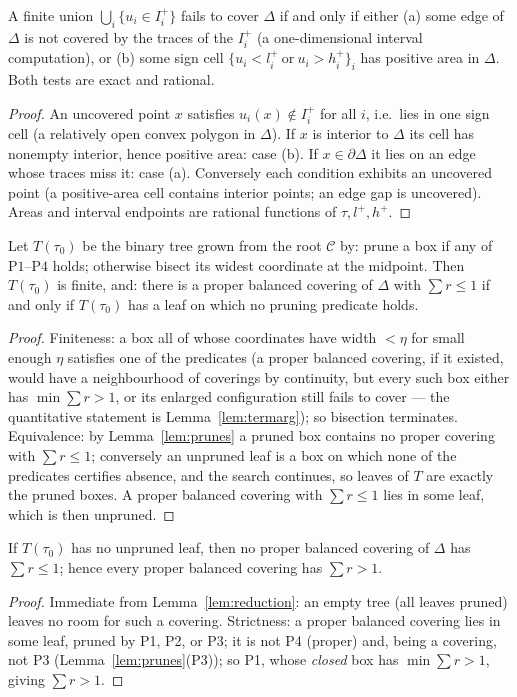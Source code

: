 \begin{lemma}\label{lem:noncover}
A finite union $\bigcup_i\{u_i\in I_i^+\}$ fails to cover $\Delta$ if and
only if either (a) some edge of $\Delta$ is not covered by the traces of the
$I_i^+$ (a one-dimensional interval computation), or (b) some sign cell
$\{u_i<l_i^+\ \mathrm{or}\ u_i>h_i^+\}_i$ has positive area in $\Delta$.
Both tests are exact and rational.
\end{lemma}
\begin{proof}
An uncovered point $x$ satisfies $u_i(x)\notin I_i^+$ for all $i$, i.e.\ lies
in one sign cell (a relatively open convex polygon in $\Delta$). If $x$ is
interior to $\Delta$ its cell has nonempty interior, hence positive area:
case (b). If $x\in\partial\Delta$ it lies on an edge whose traces miss it:
case (a). Conversely each condition exhibits an uncovered point (a
positive-area cell contains interior points; an edge gap is uncovered).
Areas and interval endpoints are rational functions of $\tau,l^+,h^+$.
\end{proof}

\begin{lemma}\label{lem:reduction}
Let $T(\tau_0)$ be the binary tree grown from the root $\mathcal C$ by:
prune a box if any of $\mathrm{P1}$--$\mathrm{P4}$ holds; otherwise bisect its
widest coordinate at the midpoint. Then $T(\tau_0)$ is finite, and: there is a
proper balanced covering of $\Delta$ with $\sum r\le1$ if and only if
$T(\tau_0)$ has a leaf on which no pruning predicate holds.
\end{lemma}
\begin{proof}
Finiteness: a box all of whose coordinates have width $<\eta$ for small enough
$\eta$ satisfies one of the predicates (a proper balanced covering, if it
existed, would have a neighbourhood of coverings by continuity, but every such
box either has $\min\sum r>1$, or its enlarged configuration still fails to
cover --- the quantitative statement is Lemma~\ref{lem:termarg}); so bisection
terminates. Equivalence: by Lemma~\ref{lem:prunes} a pruned box contains no
proper covering with $\sum r\le1$; conversely an unpruned leaf is a box on
which none of the predicates certifies absence, and the search continues, so
leaves of $T$ are exactly the pruned boxes. A proper balanced covering with
$\sum r\le1$ lies in some leaf, which is then unpruned.
\end{proof}

\begin{lemma}\label{lem:termarg}
If $T(\tau_0)$ has no unpruned leaf, then no proper balanced covering of
$\Delta$ has $\sum r\le1$; hence every proper balanced covering has
$\sum r>1$.
\end{lemma}
\begin{proof}
Immediate from Lemma~\ref{lem:reduction}: an empty tree (all leaves pruned)
leaves no room for such a covering. Strictness: a proper balanced covering
lies in some leaf, pruned by P1, P2, or P3; it is not P4 (proper) and, being a
covering, not P3 (Lemma~\ref{lem:prunes}(P3)); so P1, whose \emph{closed} box
has $\min\sum r>1$, giving $\sum r>1$.
\end{proof}

